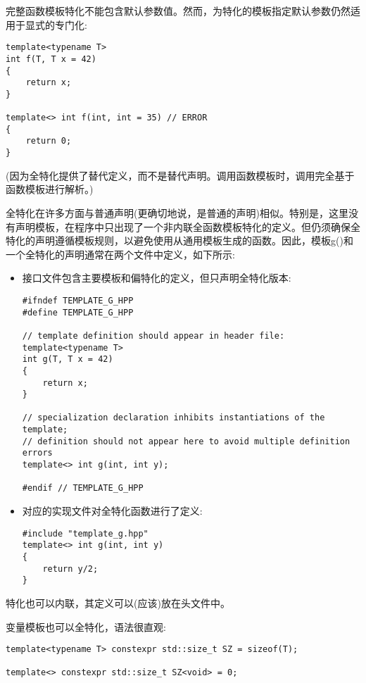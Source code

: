 完整函数模板特化不能包含默认参数值。然而，为特化的模板指定默认参数仍然适用于显式的专门化:

\begin{lstlisting}[style=styleCXX]
template<typename T>
int f(T, T x = 42)
{
	return x;
}

template<> int f(int, int = 35) // ERROR
{
	return 0;
}
\end{lstlisting}

(因为全特化提供了替代定义，而不是替代声明。调用函数模板时，调用完全基于函数模板进行解析。)

全特化在许多方面与普通声明(更确切地说，是普通的声明)相似。特别是，这里没有声明模板，在程序中只出现了一个非内联全函数模板特化的定义。但仍须确保全特化的声明遵循模板规则，以避免使用从通用模板生成的函数。因此，模板g()和一个全特化的声明通常在两个文件中定义，如下所示:

\begin{itemize}
\item 
接口文件包含主要模板和偏特化的定义，但只声明全特化版本:

\begin{lstlisting}[style=styleCXX]
#ifndef TEMPLATE_G_HPP
#define TEMPLATE_G_HPP

// template definition should appear in header file:
template<typename T>
int g(T, T x = 42)
{
	return x;
}

// specialization declaration inhibits instantiations of the template;
// definition should not appear here to avoid multiple definition errors
template<> int g(int, int y);

#endif // TEMPLATE_G_HPP
\end{lstlisting}

\item 
对应的实现文件对全特化函数进行了定义:

\begin{lstlisting}[style=styleCXX]
#include "template_g.hpp"
template<> int g(int, int y)
{
	return y/2;
}
\end{lstlisting}
\end{itemize}

特化也可以内联，其定义可以(应该)放在头文件中。


变量模板也可以全特化，语法很直观:

\begin{lstlisting}[style=styleCXX]
template<typename T> constexpr std::size_t SZ = sizeof(T);

template<> constexpr std::size_t SZ<void> = 0;
\end{lstlisting}

